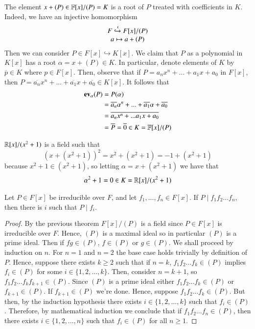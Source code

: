 \documentclass[12pt, a4paper, oneside, openright, titlepage]{book}
\begin{document}
\begin{note}
        The element $x+(P) \in \mathbb F[x]/(P) = K$ is a root of $P$ treated with coefficients in $K$. Indeed, we have an injective homomorphism \begin{equation}
                \begin{array}{c} F\xhookrightarrow{\iota} F[x]/(P) \\ a \mapsto a+(P) \end{array}
        \end{equation}
        Then we can consider $P \in F[x] \hookrightarrow K[x]$. We claim that $P$ as a polynomial in $K[x]$ has a root $\alpha = x+(P) \in K$. In particular, denote elements of $K$ by $\overline{p} \in K$ where $p \in F[x]$. Then, observe that if $P = a_nx^n+...+a_1x+a_0$ in $F[x]$, then $P = \overline{a_n}x^n+...+\overline{a_1}x+\overline{a_0} \in K[x]$. It follows that \begin{align*}
                \operatorname{\bf{ev}}_{\alpha}(P) &= P(\alpha) \\
                &= \overline{a_n}\alpha^n+...+\overline{a_1}\alpha+\overline{a_0}\\
                &= \overline{a_nx^n + ... a_1x+a_0} \\
                &= \overline{P} = \overline{0} \in K = \mathbb F[x]/(P)
        \end{align*}
\end{note}

\begin{eg}
        $\mathbb R[x]/(x^2+1)$ is a field such that \begin{equation}
                (x+(x^2+1))^2 = x^2+(x^2+1) = -1+(x^2+1)
        \end{equation}
        because $x^2+1 \in (x^2+1)$, so letting $\alpha = x+(x^2+1)$ we have that \begin{equation}
                \alpha^2+1 = 0 \in K = \mathbb R[x]/(x^2+1)
        \end{equation}
\end{eg}


\begin{cor}
    Let $P \in F[x]$ be irreducible over $F$, and let $f_1,...,f_n \in F[x]$. If $P\;\vert\;f_1f_2...f_n$, then there is $i$ such that $P\;\vert\;f_i$.
\end{cor}
\begin{proof}
    By the previous theorem $F[x]/(P)$ is a field since $P \in F[x]$ is irreducible over $F$. Hence, $(P)$ is a maximal ideal so in particular $(P)$ is a prime ideal. Then if $fg \in (P)$, $f\in (P)$ or $g \in (P)$. We shall proceed by induction on $n$. For $n = 1$ and $n = 2$ the base case holds trivially by definition of $P$. Hence, suppose there exists $k \geq 2$ such that if $n = k$, $f_1f_2...f_k \in (P)$ implies $f_i \in (P)$ for some $i \in \{1,2,...,k\}$. Then, consider $n = k+1$, so $f_1f_2...f_kf_{k+1} \in (P)$. Since $(P)$ is a prime ideal either $f_1f_2...f_k \in (P)$ or $f_{k+1} \in (P)$. If $f_{k+1} \in (P)$ we're done. Hence, suppose $f_1f_2...f_k \in (P)$. But then, by the induction hypothesis there exists $i \in \{1,2,...,k\}$ such that $f_i \in (P)$. Therefore, by mathematical induction we conclude that if $f_1f_2...f_n \in (P)$, then there exists $i \in \{1,2,...,n\}$ such that $f_i \in (P)$ for all $n \geq 1$.
\end{proof}
\end{document}
